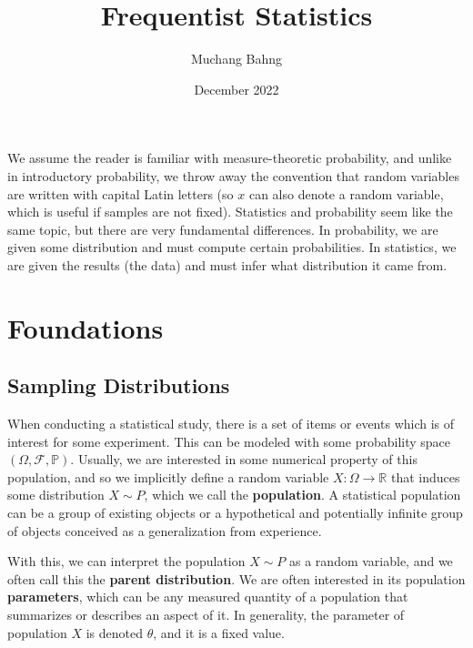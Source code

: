 \documentclass{article}
\begin{document}
\title{Frequentist Statistics}
\author{Muchang Bahng}
\date{December 2022}

\maketitle
\tableofcontents
\pagebreak

  We assume the reader is familiar with measure-theoretic probability, and unlike in introductory probability, we throw away the convention that random variables are written with capital Latin letters (so $x$ can also denote a random variable, which is useful if samples are not fixed). Statistics and probability seem like the same topic, but there are very fundamental differences. In probability, we are given some distribution and must compute certain probabilities. In statistics, we are given the results (the data) and must infer what distribution it came from. 

\section{Foundations}

  \subsection{Sampling Distributions}

    \begin{definition}
      When conducting a statistical study, there is a set of items or events which is of interest for some experiment. This can be modeled with some probability space $(\Omega, \mathcal{F}, \mathbb{P})$. Usually, we are interested in some numerical property of this population, and so we implicitly define a random variable $X: \Omega \longrightarrow \mathbb{R}$ that induces some distribution $X \sim P$, which we call the \textbf{population}. A statistical population can be a group of existing objects or a hypothetical and potentially infinite group of objects conceived as a generalization from experience. 

      With this, we can interpret the population $X \sim P$ as a random variable, and we often call this the \textbf{parent distribution}. We are often interested in its population \textbf{parameters}, which can be any measured quantity of a population that summarizes or describes an aspect of it. In generality, the parameter of population $X$ is denoted $\theta$, and it is a fixed value. 
    \end{definition} 
\end{document}
